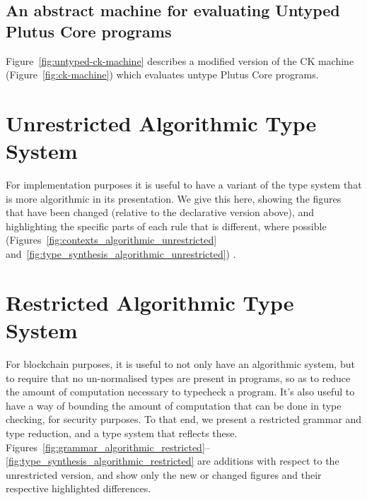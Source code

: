 \documentclass[a4paper]{article}
\begin{document}


\subsection{An abstract machine for evaluating Untyped Plutus Core programs}
Figure~\ref{fig:untyped-ck-machine} describes a modified version of
the CK machine (Figure~\ref{fig:ck-machine}) which evaluates untype Plutus
Core programs.


\begin{appendices}
\section{Unrestricted Algorithmic Type System}

For implementation purposes it is useful to have a variant of the type
system that is more algorithmic in its presentation. We give this
here, showing the figures that have been changed (relative to the
declarative version above), and highlighting the specific parts of
each rule that is different, where possible
(Figures~\ref{fig:contexts_algorithmic_unrestricted}
and~\ref{fig:type_synthesis_algorithmic_unrestricted}) .



\newpage

\section{Restricted Algorithmic Type System}

For blockchain purposes, it is useful to not only have an algorithmic
system, but to require that no un-normalised types are present in
programs, so as to reduce the amount of computation necessary to
typecheck a program. It's also useful to have a way of bounding the
amount of computation that can be done in type checking, for security
purposes. To that end, we present a restricted grammar and type
reduction, and a type system that reflects these.
Figures~\ref{fig:grammar_algorithmic_restricted}--\ref{fig:type_synthesis_algorithmic_restricted}
are additions with respect to the unrestricted version, and show only
the new or changed figures and their respective highlighted
differences.







\end{appendices}


\end{document}
